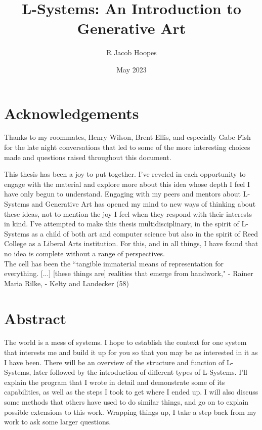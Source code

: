 \documentclass[12pt,twoside]{reedthesis}
\title{L-Systems: An Introduction to Generative Art} %
\author{R Jacob Hoopes}
\date{May 2023}
\begin{document}
  \maketitle
  \frontmatter %
  \pagestyle{empty} %

    \chapter*{Acknowledgements}
	Thanks to my roommates, Henry Wilson, Brent Ellis, and especially Gabe Fish for the late night conversations that led to some of the more interesting choices made and questions raised throughout this document.
	
	This thesis has been a joy to put together. I've reveled in each opportunity to engage with the material and explore more about this idea whose depth I feel I have only begun to understand. Engaging with my peers and mentors about L-Systems and Generative Art has opened my mind to new ways of thinking about these ideas, not to mention the joy I feel when they respond with their interests in kind. I've attempted to make this thesis multidisciplinary, in the spirit of L-Systems as a child of both art and computer science but also in the spirit of Reed College as a Liberal Arts institution. For this, and in all things, I have found that no idea is complete without a range of perspectives.\\
	
	The cell has been the ``tangible immaterial means of representation for everything. [...] [these things are] realities that emerge from handwork," - Rainer Maria Rilke, - Kelty and Landecker (58)


    \tableofcontents

\chapter*{Abstract}
	The world is a mess of systems. I hope to establish the context for one system that interests me and build it up for you so that you may be as interested in it as I have been. There will be an overview of the structure and function of L-Systems, later followed by the introduction of different types of L-Systems. I'll explain the program that I wrote in detail and demonstrate some of its capabilities, as well as the steps I took to get where I ended up. I will also discuss some methods that others have used to do similar things, and go on to explain possible extensions to this work. Wrapping things up, I take a step back from my work to ask some larger questions.
	
\end{document}
